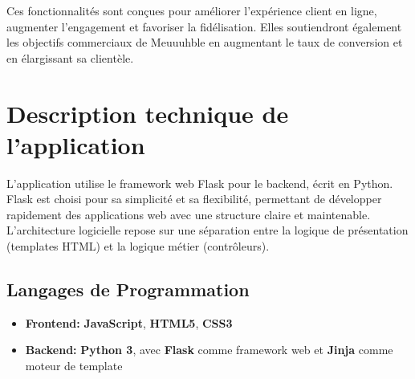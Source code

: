 Ces fonctionnalités sont conçues pour améliorer l'expérience client en ligne, augmenter
l'engagement et favoriser la fidélisation. Elles soutiendront également les objectifs commerciaux de
Meuuuhble en augmentant le taux de conversion et en élargissant sa clientèle.

\section{Description technique de l'application}

L'application utilise le framework web Flask pour le backend, écrit en Python. Flask est choisi pour sa simplicité et sa flexibilité, permettant de développer rapidement des applications web avec une structure claire et maintenable. L'architecture logicielle repose sur une séparation entre la logique de présentation (templates HTML) et la logique métier (contrôleurs).

\subsection{Langages de Programmation}
\begin{itemize}
	\item \textbf{Frontend:} \textbf{JavaScript}, \textbf{HTML5}, \textbf{CSS3}
	\item \textbf{Backend:} \textbf{Python 3}, avec \textbf{Flask} comme framework web et \textbf{Jinja} comme moteur de template	
\end{itemize}


